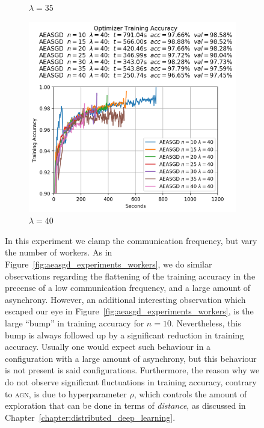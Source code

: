 \begin{figure}
\begin{subfigure}{.3\textwidth}
    \caption{$\lambda = 35$}
  \end{subfigure}
  \begin{subfigure}{.3\textwidth}
    \centering
    \includegraphics[width=\linewidth]{resources/images/aeasgd_experiments_lambda_40}
    \caption{$\lambda = 40$}
  \end{subfigure}
  \caption{In this experiment we clamp the communication frequency, but vary the number of workers. As in Figure~\ref{fig:aeasgd_experiments_workers}, we do similar observations regarding the flattening of the training accuracy in the precense of a low communication frequency, and a large amount of asynchrony. However, an additional interesting observation which escaped our eye in Figure~\ref{fig:aeasgd_experiments_workers}, is the large ``bump'' in training accuracy for $n = 10$. Nevertheless, this bump is always followed up by a significant reduction in training accuracy. Usually one would expect such behaviour in a configuration with a large amount of asynchrony, but this behaviour is not present is said configurations. Furthermore, the reason why we do not observe significant fluctuations in training accuracy, contrary to \textsc{agn}, is due to hyperparameter $\rho$, which controls the amount of exploration that can be done in terms of \emph{distance}, as discussed in Chapter~\ref{chapter:distributed_deep_learning}.}
  \label{fig:aeasgd_experiments_lambdas}
\end{figure}
